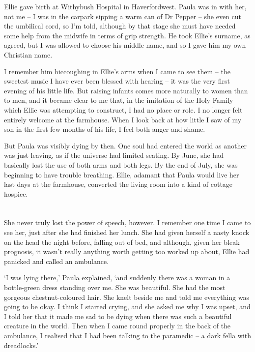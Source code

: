Ellie gave birth at Withybush Hospital in Haverfordwest. Paula was in with her, not me -- I was in the carpark sipping a warm can of Dr Pepper -- she even cut the umbilical cord, so I'm told, although by that stage she must have needed some help from the midwife in terms of grip strength. He took Ellie's surname, as agreed, but I was allowed to choose his middle name, and so I gave him my own Christian name.

I remember him hiccoughing in Ellie's arms when I came to see them -- the sweetest music I have ever been blessed with hearing -- it was the very first evening of his little life. But raising infants comes more naturally to women than to men, and it became clear to me that, in the imitation of the Holy Family which Ellie was attempting to construct, I had no place or role. I no longer felt entirely welcome at the farmhouse. When I look back at how little I saw of my son in the first few months of his life, I feel both anger and shame.

But Paula was visibly dying by then. One soul had entered the world as another was just leaving, as if the universe had limited seating. By June, she had basically lost the use of both arms and both legs. By the end of July, she was beginning to have trouble breathing. Ellie, adamant that Paula would live her last days at the farmhouse, converted the living room into a kind of cottage hospice.

\section{}

She never truly lost the power of speech, however. I remember one time I came to see her, just after she had finished her lunch. She had given herself a nasty knock on the head the night before, falling out of bed, and although, given her bleak prognosis, it wasn't really anything worth getting too worked up about, Ellie had panicked and called an ambulance.

`I was lying there,' Paula explained, `and suddenly there was a woman in a bottle-green dress standing over me. She was beautiful. She had the most gorgeous chestnut-coloured hair. She knelt beside me and told me everything was going to be okay. I think I started crying, and she asked me why I was upset, and I told her that it made me sad to be dying when there was such a beautiful creature in the world. Then when I came round properly in the back of the ambulance, I realised that I had been talking to the paramedic -- a dark fella with dreadlocks.'

